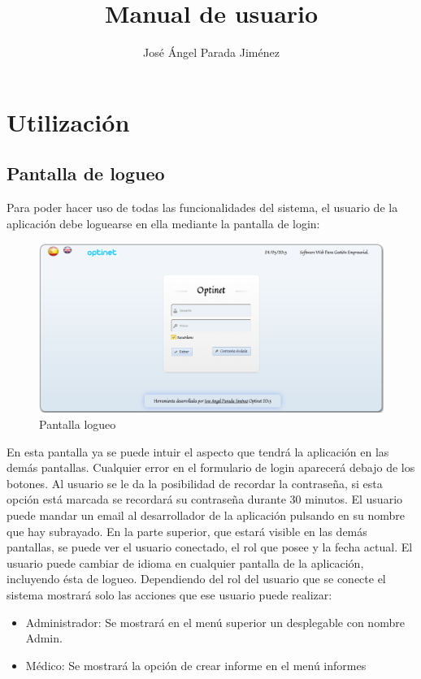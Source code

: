 \documentclass[a4paper,11pt]{book}
\title{Manual de usuario}
\author{José Ángel Parada Jiménez}
\begin{document}
\section{Utilización}

\subsection {Pantalla de logueo}
Para poder hacer uso de todas las funcionalidades del sistema, el usuario de la aplicación debe loguearse en ella mediante la pantalla de login:

\begin{figure}[!htb]
  \centering
    \includegraphics[scale=0.35]{caplogin.png}
  \caption{Pantalla logueo}
  \label{a}
\end{figure}

En esta pantalla ya se puede intuir el aspecto que tendrá la aplicación en las demás pantallas. Cualquier error en el formulario de login aparecerá debajo de los botones. Al usuario se le da la posibilidad de recordar la contraseña, si esta opción está marcada se recordará su contraseña durante 30 minutos. El usuario puede mandar un email al desarrollador de la aplicación pulsando en su nombre que hay subrayado. En la parte superior, que estará visible en las demás pantallas, se puede ver el usuario conectado, el rol que posee y la fecha actual. El usuario puede cambiar de idioma en cualquier pantalla de la aplicación, incluyendo ésta de logueo. Dependiendo del rol del usuario que se conecte el sistema mostrará solo las acciones que ese usuario puede realizar:
\begin{itemize}
\item Administrador: Se mostrará en el menú superior un desplegable con nombre Admin.
\item Médico: Se mostrará la opción de crear informe en el menú informes
\end{itemize}
\end{document}
